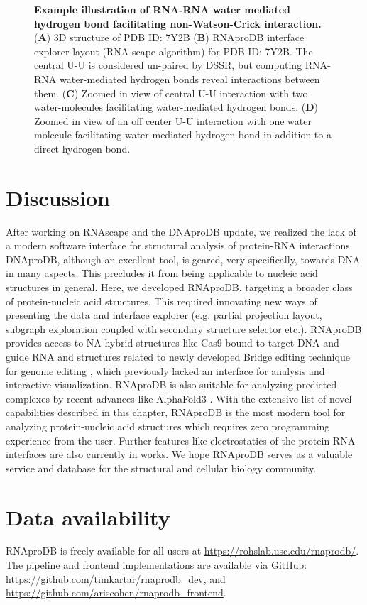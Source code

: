 \begin{center}
    \begin{figure}
        \caption[Example illustration of RNA-RNA water mediated hydrogen bond facilitating non-Watson-Crick interaction.]{\textbf{Example illustration of RNA-RNA water mediated hydrogen bond facilitating non-Watson-Crick interaction.} ({\bf A}) 3D structure of PDB ID: 7Y2B  ({\bf B}) RNAproDB interface explorer layout (RNA scape algorithm) for PDB ID: 7Y2B. The central U-U is considered un-paired by DSSR, but computing RNA-RNA water-mediated hydrogen bonds reveal interactions between them. ({\bf C}) Zoomed in view of central U-U interaction with two water-molecules facilitating water-mediated hydrogen bonds. ({\bf D}) Zoomed in view of an off center U-U interaction with one water molecule facilitating water-mediated hydrogen bond in addition to a direct hydrogen bond.}
  \label{fig:rnaprodb3}
\end{figure}
\end{center}

\section{Discussion}

After working on RNAscape \citep{Mitra2024rnascape} and the DNAproDB \citep{Sagendorf2017, Sagendorf2020} update, we realized the lack of a modern software interface for structural analysis of protein-RNA interactions. DNAproDB, although an excellent tool, is geared, very specifically, towards DNA in many aspects. This precludes it from being applicable to nucleic acid structures in general. Here, we developed RNAproDB, targeting a broader class of protein-nucleic acid structures. This required innovating new ways of presenting the data and interface explorer (e.g. partial projection layout, subgraph exploration coupled with secondary structure selector etc.). RNAproDB provides access to NA-hybrid structures like Cas9 bound to target DNA and guide RNA \citep{nishimasu2014crystal,} and structures related to newly developed Bridge editing technique for genome editing \citep{durrant2024bridge}, which previously lacked an interface for analysis and interactive visualization. RNAproDB is also suitable for analyzing predicted complexes by recent advances like AlphaFold3 \citep{Abramson2024}. With the extensive list of novel capabilities described in this chapter, RNAproDB is the most modern tool for analyzing protein-nucleic acid structures which requires zero programming experience from the user. Further features like electrostatics of the protein-RNA interfaces are also currently in works. We hope RNAproDB serves as a valuable service and database for the structural and cellular biology community.

\section{Data availability}
RNAproDB is freely available for all users at \url{https://rohslab.usc.edu/rnaprodb/}.
The pipeline and frontend implementations are available via GitHub:
\url{https://github.com/timkartar/rnaprodb_dev}, and
\url{https://github.com/ariscohen/rnaprodb_frontend}.
